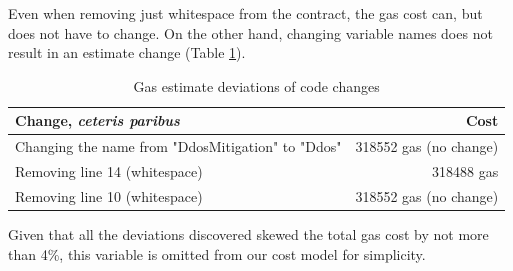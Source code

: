 Even when removing just whitespace from the contract, the gas cost can, but does not have to change. On the other hand, changing variable names does not result in an estimate change (Table \ref{table:GasDeviationsCode}).

\begin{table}
  \begin{center}
    \begin{tabular}{ l | r }
      \hline
      \textbf{Change, \textit{ceteris paribus}} & \textbf{Cost} \\ \hline
      Changing the name from "DdosMitigation" to "Ddos" & 318552 gas (no change) \\ \hline
      Removing line 14 (whitespace) & 318488 gas \\ \hline
      Removing line 10 (whitespace) & 318552 gas (no change) \\
      \hline
    \end{tabular}
    \caption{Gas estimate deviations of code changes}
    \label{table:GasDeviationsCode}
  \end{center}

\end{table}

Given that all the deviations discovered skewed the total gas cost by not more than 4\%, this variable is omitted from our cost model for simplicity.
